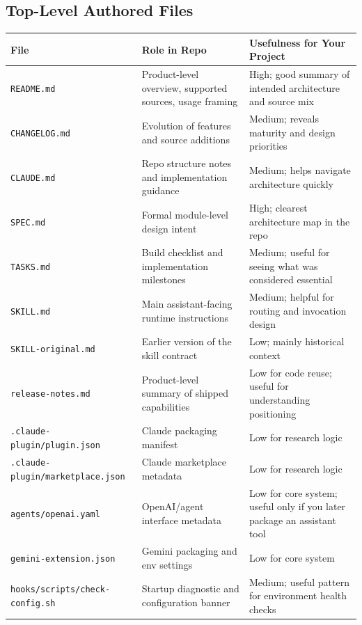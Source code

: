 \documentclass[11pt, letterpaper]{article}
\begin{document}
\subsection{Top-Level Authored Files}

\begin{longtable}{p{4.0cm}p{4.9cm}p{4.7cm}}
\toprule
\textbf{File} & \textbf{Role in Repo} & \textbf{Usefulness for Your Project} \\
\midrule
\endhead
\texttt{README.md} & Product-level overview, supported sources, usage framing & High; good summary of intended architecture and source mix \\
\texttt{CHANGELOG.md} & Evolution of features and source additions & Medium; reveals maturity and design priorities \\
\texttt{CLAUDE.md} & Repo structure notes and implementation guidance & Medium; helps navigate architecture quickly \\
\texttt{SPEC.md} & Formal module-level design intent & High; clearest architecture map in the repo \\
\texttt{TASKS.md} & Build checklist and implementation milestones & Medium; useful for seeing what was considered essential \\
\texttt{SKILL.md} & Main assistant-facing runtime instructions & Medium; helpful for routing and invocation design \\
\texttt{SKILL-original.md} & Earlier version of the skill contract & Low; mainly historical context \\
\texttt{release-notes.md} & Product-level summary of shipped capabilities & Low for code reuse; useful for understanding positioning \\
\texttt{.claude-plugin/plugin.json} & Claude packaging manifest & Low for research logic \\
\texttt{.claude-plugin/marketplace.json} & Claude marketplace metadata & Low for research logic \\
\texttt{agents/openai.yaml} & OpenAI/agent interface metadata & Low for core system; useful only if you later package an assistant tool \\
\texttt{gemini-extension.json} & Gemini packaging and env settings & Low for core system \\
\texttt{hooks/scripts/check-config.sh} & Startup diagnostic and configuration banner & Medium; useful pattern for environment health checks \\
\bottomrule
\end{longtable}
\end{document}
